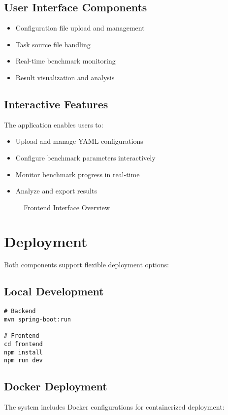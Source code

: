 \subsection{User Interface Components}
\begin{itemize}
    \item Configuration file upload and management
    \item Task source file handling
    \item Real-time benchmark monitoring
    \item Result visualization and analysis
\end{itemize}

\subsection{Interactive Features}
The application enables users to:
\begin{itemize}
    \item Upload and manage YAML configurations
    \item Configure benchmark parameters interactively
    \item Monitor benchmark progress in real-time
    \item Analyze and export results
\end{itemize}

\begin{figure}[h]
    \centering
    \caption{Frontend Interface Overview}
    \label{fig:frontend-ui}
\end{figure}

\section{Deployment}

Both components support flexible deployment options:

\subsection{Local Development}
\begin{verbatim}
# Backend
mvn spring-boot:run

# Frontend
cd frontend
npm install
npm run dev
\end{verbatim}

\subsection{Docker Deployment}
The system includes Docker configurations for containerized deployment:

